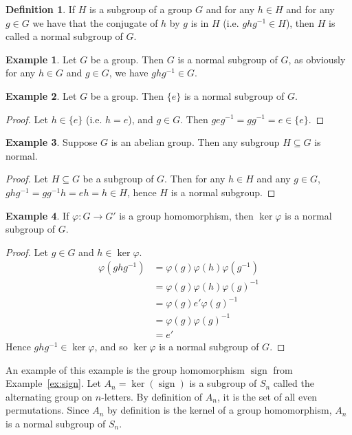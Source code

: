 \documentclass[12pt,letterpaper,DIV=11,final]{scrartcl}
\theoremstyle{plain}
\theoremstyle{definition}
\newtheorem{definition}{Definition}[section]
\newtheorem{example}{Example}[section]
\theoremstyle{remark}
\DeclareMathOperator{\sign}{sign}
\begin{document}
\begin{definition}
  If $H$ is a subgroup of a group $G$ and for any $h \in H$ and for any $g \in G$ we have that the conjugate of $h$ by $g$ is in $H$ (i.e. $g h g^{-1} \in H$),
  then $H$ is called a normal subgroup of $G$.
\end{definition}

\begin{example}
  Let $G$ be a group.
  Then $G$ is a normal subgroup of $G$, as obviously for any $h \in G$ and $g \in G$, we have $g h g^{-1} \in G$.
\end{example}

\begin{example}
  Let $G$ be a group.
  Then $\{ e \}$ is a normal subgroup of $G$.

  \begin{proof}
    Let $h \in \{ e \}$ (i.e. $h = e$), and $g \in G$.
    Then $g e g^{-1} = g g^{-1} = e \in \{ e \}$.
  \end{proof}
\end{example}

\begin{example}
  Suppose $G$ is an abelian group.
  Then any subgroup $H \subseteq G$ is normal.

  \begin{proof}
    Let $H \subseteq G$ be a subgroup of $G$.
    Then for any $h \in H$ and any $g \in G$, $g h g^{-1} = g g^{-1} h = eh = h \in H$, hence $H$ is a normal subgroup.
  \end{proof}
\end{example}

\begin{example}
  If $\varphi : G \to G'$ is a group homomorphism, then $\ker \varphi$ is a normal subgroup of $G$.

  \begin{proof}
    Let $g \in G$ and $h \in \ker \varphi$.
    \begin{align*}
      \varphi(g h g^{-1}) &= \varphi(g) \varphi(h) \varphi(g^{-1}) \\
                          &= \varphi(g) \varphi(h) {\varphi(g)}^{-1} \\
                          &= \varphi(g) e' {\varphi(g)}^{-1} \\
                          &= \varphi(g) {\varphi(g)}^{-1} \\
                          &= e'
    \end{align*}
    Hence $g h g^{-1} \in \ker \varphi$, and so $\ker \varphi$ is a normal subgroup of $G$.
  \end{proof}

  An example of this example is the group homomorphism $\sign$ from Example~\ref{ex:sign}.
  Let $A_n = \ker(\sign)$ is a subgroup of $S_n$ called the alternating group on $n$-letters.
  By definition of $A_n$, it is the set of all even permutations.
  Since $A_n$ by definition is the kernel of a group homomorphism, $A_n$ is a normal subgroup of $S_n$.
\end{example}
\end{document}
